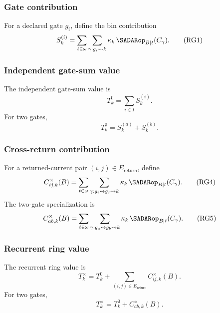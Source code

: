 \subsubsection{Gate contribution}
\label{subsec:frg-gate-contribution}
For a declared gate \(g_i\), define the bin contribution
\begin{equation}
S_k^{(i)}
=
\sum_{t\in\omega}
\sum_{\gamma:g_i\leadsto k}
\kappa_k\,
\SADARop_{B|t}(C_\gamma).
\tag{RG1}
\label{eq:frg-gate-contribution}
\end{equation}

\subsubsection{Independent gate-sum value}
\label{subsec:frg-independent-gate-sum}
The independent gate-sum value is
\begin{equation}
T_k^0=\sum_{i\in I}S_k^{(i)}.
\tag{RG2}
\label{eq:frg-independent-gate-sum}
\end{equation}
For two gates,
\begin{equation}
T_k^0=S_k^{(a)}+S_k^{(b)}.
\tag{RG3}
\label{eq:frg-independent-two-gate}
\end{equation}

\subsubsection{Cross-return contribution}
\label{subsec:frg-cross-return-contribution}
For a returned-current pair \((i,j)\in E_{\mathrm{return}}\), define
\begin{equation}
C_{ij,k}^{\times}(B)
=
\sum_{t\in\omega}
\sum_{\gamma:g_i\leftrightarrow g_j\leadsto k}
\kappa_k\,
\SADARop_{B|t}(C_\gamma).
\tag{RG4}
\label{eq:frg-cross-return-contribution}
\end{equation}
The two-gate specialization is
\begin{equation}
C_{ab,k}^{\times}(B)
=
\sum_{t\in\omega}
\sum_{\gamma:g_a\leftrightarrow g_b\leadsto k}
\kappa_k\,
\SADARop_{B|t}(C_\gamma).
\tag{RG5}
\label{eq:frg-cross-return-two-gate}
\end{equation}

\subsubsection{Recurrent ring value}
\label{subsec:frg-recurrent-ring-value}
The recurrent ring value is
\begin{equation}
T_k^\times
=
T_k^0+
\sum_{(i,j)\in E_{\mathrm{return}}}
C_{ij,k}^{\times}(B).
\tag{RG6}
\label{eq:frg-recurrent-ring-value}
\end{equation}
For two gates,
\begin{equation}
T_k^\times=T_k^0+C_{ab,k}^{\times}(B).
\tag{RG7}
\label{eq:frg-recurrent-two-gate}
\end{equation}

